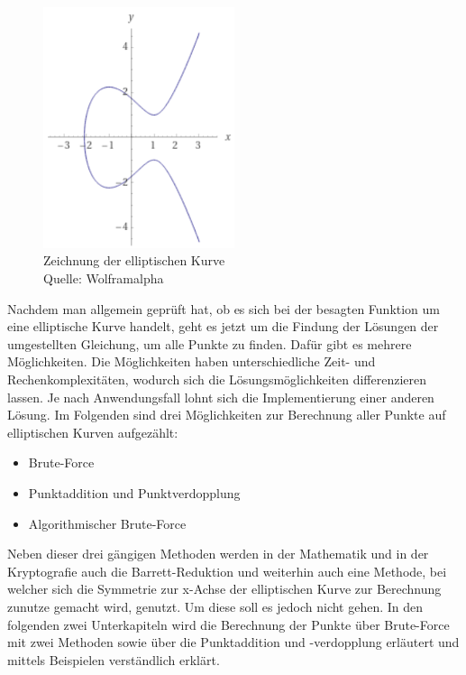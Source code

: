 \begin{figure}[H]
    \centering
    \includegraphics[width=0.5\textwidth]{grafiken/kurve_beispiel_1_punktberechnung.png}
    \caption[Zeichnung der elliptischen Kurve]{Zeichnung der elliptischen Kurve \\ Quelle: Wolframalpha}
    \label{fig:kurve_beispiel_1_punktberechnung}
\end{figure}

Nachdem man allgemein geprüft hat, ob es sich bei der besagten Funktion um eine elliptische Kurve handelt, geht es jetzt um die Findung der Lösungen der umgestellten Gleichung, um alle Punkte zu finden. Dafür gibt es mehrere Möglichkeiten. Die Möglichkeiten haben unterschiedliche Zeit- und Rechenkomplexitäten, wodurch sich die Lösungsmöglichkeiten differenzieren lassen. Je nach Anwendungsfall lohnt sich die Implementierung einer anderen Lösung. Im Folgenden sind drei Möglichkeiten zur Berechnung aller Punkte auf elliptischen Kurven aufgezählt:

\begin{itemize}
\item Brute-Force
\item Punktaddition und Punktverdopplung
\item Algorithmischer Brute-Force
\end{itemize}

Neben dieser drei gängigen Methoden werden in der Mathematik und in der Kryptografie auch die Barrett-Reduktion und weiterhin auch eine Methode, bei welcher sich die Symmetrie zur x-Achse der elliptischen Kurve zur Berechnung zunutze gemacht wird, genutzt. Um diese soll es jedoch nicht gehen. In den folgenden zwei Unterkapiteln wird die Berechnung der Punkte über Brute-Force mit zwei Methoden sowie über die Punktaddition und -verdopplung erläutert und mittels Beispielen verständlich erklärt.

